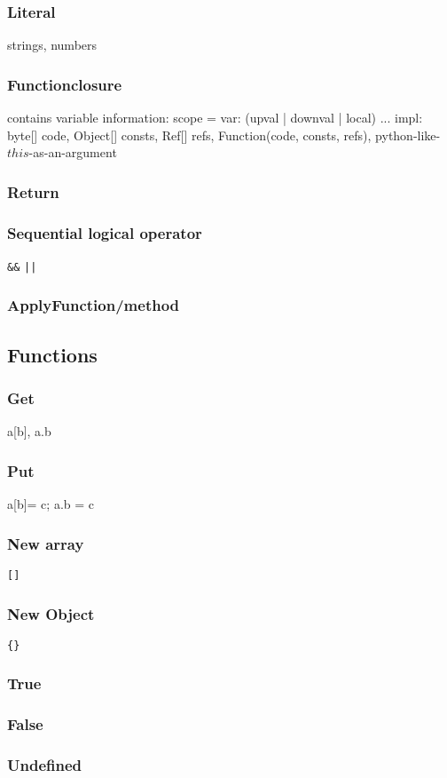 \subsubsection{Literal}
strings, numbers
\subsubsection{Functionclosure}
contains variable information: scope = {var: (upval | downval | local) ... }
impl: byte[] code, Object[] consts, Ref[] refs, Function(code, consts, refs), 
python-like-$this$-as-an-argument
\subsubsection{Return}
\subsubsection{Sequential logical operator}
\verb|&&| \verb#||#
\subsubsection{ApplyFunction/method}

\subsection{Functions}
\subsubsection{Get}
a[b], a.b
\subsubsection{Put}
a[b]= c; a.b = c
\subsubsection{New array}
\verb|[]|
\subsubsection{New Object}
\verb|{}|
\subsubsection{True}
\subsubsection{False}
\subsubsection{Undefined}
